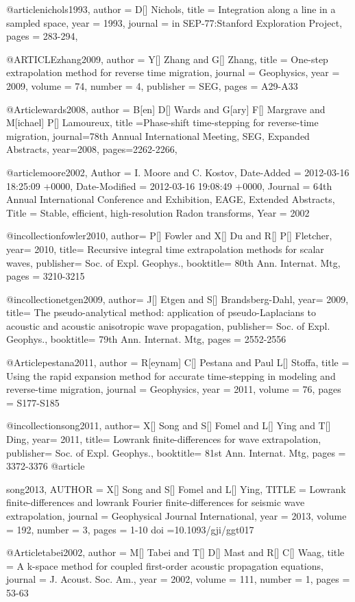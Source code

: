 @article{nichols1993,
  author =	 {D[] Nichols},
  title =	 {Integration along a line in a sampled space},
  year =	 1993,
  journal =	 {in SEP-77:Stanford Exploration Project},
  pages =	 {283-294},
}

@ARTICLE{zhang2009,
  author = {Y[] Zhang and G[] Zhang},
  title = {One-step extrapolation method for reverse time migration},
  journal = {Geophysics},
  year = {2009},
  volume = {74},
  number = {4},
  publisher = {SEG},
  pages = {A29-A33}
}

@Article{wards2008,
  author = {B[en] D[] Wards and G[ary] F[] Margrave and M[ichael] P[] Lamoureux},
  title ={Phase-shift time-stepping for reverse-time migration},
  journal={78th Annual International Meeting, SEG, Expanded Abstracts},
  year=2008,
  pages={2262-2266},
}

@article{moore2002,
	Author = {I. Moore and C. Kostov},
	Date-Added = {2012-03-16 18:25:09 +0000},
	Date-Modified = {2012-03-16 19:08:49 +0000},
	Journal = {64th Annual International Conference and Exhibition, EAGE, Extended Abstracts},
	Title = {Stable, efficient, high-resolution {R}adon transforms},
	Year = {2002}}

@incollection{fowler2010,
	author=	{P[] Fowler and X[] Du and R[] P[] Fletcher},
	year=	2010,
	title=	{Recursive integral time extrapolation methods 
for scalar waves},
	publisher=	{Soc. of Expl. Geophys.},
	booktitle=	{80th Ann. Internat. Mtg},
        pages = {3210-3215}
	}



@incollection{etgen2009,
	author=	{J[] Etgen and S[] Brandsberg-Dahl},
	year=	2009,
	title=	{The pseudo-analytical method: application of {pseudo-Laplacians} to acoustic and acoustic anisotropic wave propagation},
	publisher=	{Soc. of Expl. Geophys.},
	booktitle=	{79th Ann. Internat. Mtg},
        pages = {2552-2556}
	}

@Article{pestana2011,
  author = 	 {R[eynam] C[] Pestana and Paul L[] Stoffa},
  title = 	 {Using the rapid expansion method for accurate time-stepping in modeling and reverse-time migration},
  journal = 	 {Geophysics},
  year = 	 2011,
  volume = 	 76,
  pages = 	 {S177-S185}}

@incollection{song2011,
	author=	{X[] Song and S[] Fomel and L[] Ying and T[] Ding},
	year=	2011,
	title=	{Lowrank finite-differences for wave extrapolation},
	publisher=	{Soc. of Expl. Geophys.},
	booktitle=	{81st Ann. Internat. Mtg},
        pages = {3372-3376}
	}
@article{song2013,
  AUTHOR = {X[] Song and S[] Fomel and L[] Ying},
  TITLE = {Lowrank finite-differences and lowrank {F}ourier finite-differences for seismic wave extrapolation},
  journal = {Geophysical Journal International},
  year = 	 {2013},
  volume =       192,
  number = {3},
  pages = {1-10}
  doi =10.1093/gji/ggt017

}
@Article{tabei2002,
  author =       {M[] Tabei and T[] D[] Mast and R[] C[] Waag},
  title =     {A k-space method for coupled first-order acoustic propagation equations}, 
  journal = {J. Acoust. Soc. Am.},
  year =         2002,
  volume =       111,
  number =       1,
  pages =        {53-63}
}

